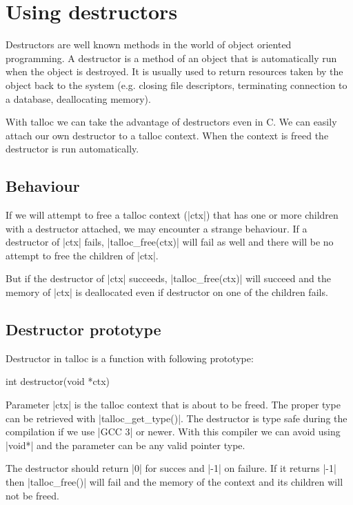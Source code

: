 \section{Using destructors}
\label{talloc:sec:destructors}

Destructors are well known methods in the world of object oriented programming.
A destructor is a method of an object that is automatically run when the object
is destroyed. It is usually used to return resources taken by the object back to
the system (e.g. closing file descriptors, terminating connection to a database,
deallocating memory).

With talloc we can take the advantage of destructors even in C. We can easily
attach our own destructor to a talloc context. When the context is freed the
destructor is run automatically.

\subsection{Behaviour}

If we will attempt to free a talloc context (|ctx|) that has one or more
children with a destructor attached, we may encounter a strange behaviour. If a
destructor of |ctx| fails, |talloc_free(ctx)| will fail as well and there will
be no attempt to free the children of |ctx|.

But if the destructor of |ctx| succeeds, |talloc_free(ctx)| will succeed and
the memory of |ctx| is deallocated even if destructor on one of the children
fails.

\subsection{Destructor prototype}

Destructor in talloc is a function with following prototype:

\begin{funcproto}
int destructor(void *ctx)
\end{funcproto}
\funclistend
Parameter |ctx| is the talloc context that is about to be freed. The proper type
can be retrieved with |talloc_get_type()|. The destructor is type safe during
the compilation if we use |GCC 3| or newer. With this compiler we can avoid 
using |void*| and the parameter can be any valid pointer type.

The destructor should return |0| for succes and |-1| on failure. If it returns
|-1| then |talloc_free()| will fail and the memory of the context and its
children will not be freed.

